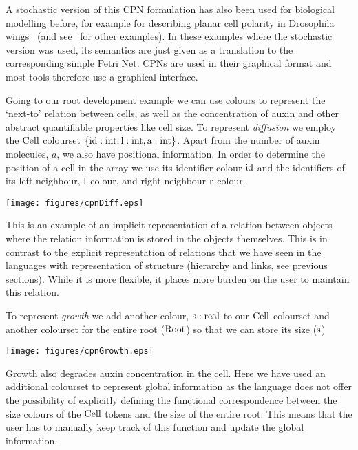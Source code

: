 A stochastic version of this CPN formulation has also been used for biological
modelling before, for example for describing planar cell polarity in Drosophila
wings~\citep{gao_multiscale_2013} (and see~\citet{runge_application_2004,
gilbert_colouring_2013} for other examples). In these examples where the
stochastic version was used, its semantics are just given as a translation to
the corresponding simple Petri Net. CPNs are used in their graphical format and
most tools therefore use a graphical interface.

Going to our root development example we can use colours to represent the
`next-to' relation between cells, as well as the concentration of auxin and
other abstract quantifiable properties like cell size. To represent \emph{diffusion} we
employ the $\mathrm{Cell}$ colourset $\{\mathrm{id}: \mathrm{int}, \mathrm{l}:\mathrm{int},
\mathrm{a}:\mathrm{int} \} $. Apart from the number of auxin molecules, $a$, we also have
positional information. In order to determine the position of a cell in the
array we use its identifier colour $\mathrm{id}$ and the identifiers of its left
neighbour, $\mathrm{l}$ colour, and right neighbour $\mathrm{r}$ colour.
\begin{center}
    \texttt{[image: figures/cpnDiff.eps]}
\end{center}
This is an example of an implicit representation of a relation between objects
where the relation information is stored in the objects themselves. This is in
contrast to the explicit representation of relations that we have seen in the
languages with representation of structure (hierarchy and links, see
previous sections). While it is more flexible, it places more burden on the user
to maintain this relation.

To represent \emph{growth} we add another colour,
$\mathrm{s}:\rm{real}$ to our $\mathrm{Cell}$ colourset and another colourset for the
entire root ($\mathrm{Root}$) so that we can store its size ($\rm{s}$)
\begin{center}
    \texttt{[image: figures/cpnGrowth.eps]}
\end{center}
Growth also degrades auxin concentration in the cell. Here we have used an
additional colourset to represent global information as the language does not
offer the possibility of explicitly defining the functional correspondence
between the size colours of the $\mathrm{Cell}$ tokens and the size of the entire
root. This means that the user has to manually keep track of this function and
update the global information.

